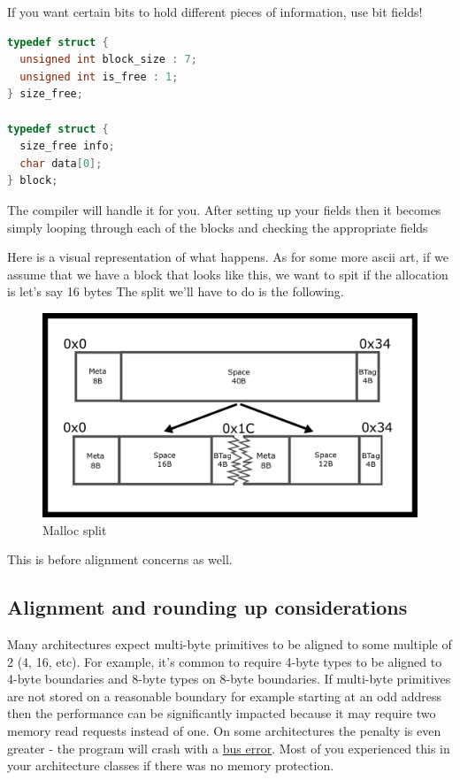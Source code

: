 If you want certain bits to hold different pieces of information, use bit fields!

\begin{lstlisting}[language=C]
typedef struct {
  unsigned int block_size : 7;
  unsigned int is_free : 1;
} size_free;

typedef struct {
  size_free info;
  char data[0];
} block;
\end{lstlisting}

The compiler will handle it for you.
After setting up your fields then it becomes simply looping through each of the blocks and checking the appropriate fields

Here is a visual representation of what happens.
As for some more ascii art, if we assume that we have a block that looks like this, we want to spit if the allocation is let's say 16 bytes
The split we'll have to do is the following.

\begin{figure}[H]
\centering
\includegraphics[width=.7\textwidth]{malloc/drawings/malloc_split.png}
\caption{Malloc split}
\end{figure}

This is before alignment concerns as well.

\subsection{Alignment and rounding up considerations}

Many architectures expect multi-byte primitives to be aligned to some multiple of 2 (4, 16, etc).
For example, it's common to require 4-byte types to be aligned to 4-byte boundaries and 8-byte types on 8-byte boundaries.
If multi-byte primitives are not stored on a reasonable boundary for example starting at an odd address then the performance can be significantly impacted because it may require two memory read requests instead of one.
On some architectures the penalty is even greater - the program will crash with a \href{http://en.wikipedia.org/wiki/Bus_error\#Unaligned_access}{bus error}.
Most of you experienced this in your architecture classes if there was no memory protection.

